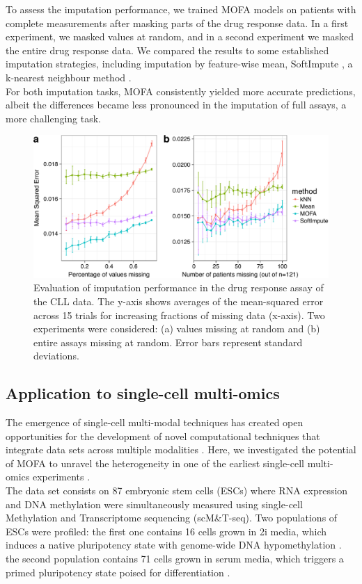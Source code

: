 To assess the imputation performance, we trained MOFA models on patients with complete measurements after masking parts of the drug response data. In a first experiment, we masked values at random, and in a second experiment we masked the entire drug response data. 
We compared the results to some established imputation strategies, including imputation by feature-wise mean, SoftImpute \cite{Mazumder2010}, a k-nearest neighbour method \cite{Troyanskaya2001}.\\

For both imputation tasks, MOFA consistently yielded more accurate predictions, albeit the differences became less pronounced in the imputation of full assays, a more challenging task.

\begin{figure}[H]
	\centering 	
	\includegraphics[width=1.0\textwidth]{MOFA_imputation}
	\caption{Evaluation of imputation performance in the drug response assay of the CLL data. The y-axis shows averages of the mean-squared error across 15 trials for increasing fractions of missing data (x-axis). Two experiments were considered: (a) values missing at random and (b) entire assays missing at random. Error bars represent standard deviations.}
	\label{fig:MOFA_imputation}
\end{figure}



\subsection{Application to single-cell multi-omics} \label{section:mofa_scmt}
The emergence of single-cell multi-modal techniques has created open opportunities for the development of novel computational techniques that integrate data sets across multiple modalities \cite{Stuart2019,Colome-Tatche2018,Chappell2018}. Here, we investigated the potential of MOFA to unravel the heterogeneity in one of the earliest single-cell multi-omics experiments \cite{Angermueller2016}.\\
The data set consists on 87 embryonic stem cells (ESCs) where RNA expression and DNA methylation were simultaneously measured using single-cell Methylation and Transcriptome sequencing (scM\&T-seq). Two populations of ESCs were profiled: the first one contains 16 cells grown in 2i media, which induces a native pluripotency state with genome-wide DNA hypomethylation \cite{Ficz2013}. the second population contains 71 cells grown in serum media, which triggers a primed pluripotency state poised for differentiation \cite{Tosolini2016}.\\

